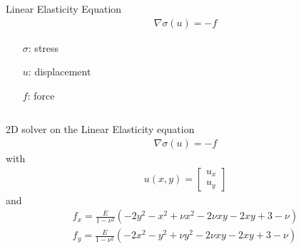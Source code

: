 \documentclass[screen]{beamer}
\begin{document}
\begin{frame}
\begin{columns}
    \begin{column}{\linewidth}
      \begin{block}{Linear Elasticity Equation}
         \begin{align*}
         \nabla \sigma(u) = -f
         \end{align*}
         \begin{itemize}
         \centering
         \item[$\sigma$: ] stress
         \item[$u$: ] displacement
         \item[$f$: ] force
         \item[ ]
         \end{itemize}
      \end{block}
    \end{column}
  \end{columns}
\end{frame}



\begin{frame}
2D solver on the Linear Elasticity equation
\begin{align*}
\nabla \sigma(u) = -f
\end{align*}
with
\scriptsize
\begin{align*}
u(x,y) = 
\begin{bmatrix}
u_x \\
u_y
\end{bmatrix}
\end{align*}
\normalsize{and}
\scriptsize
	\begin{align*}
	f_x = \frac{E}{1-\nu^2} (-2y^2 - x^2 + \nu x^2 - 2\nu xy -2xy + 3 - \nu) \\
	f_y = \frac{E}{1-\nu^2} (-2x^2 - y^2 + \nu y^2 - 2\nu xy -2xy + 3 - \nu) 
	\end{align*}
\end{frame}
\end{document}
